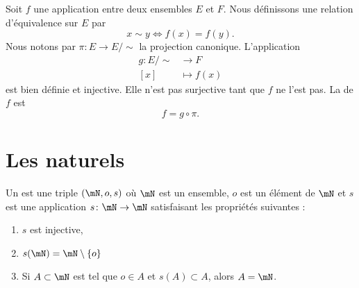 \begin{example}
Soit \( f\) une application entre deux ensembles \( E\) et \( F\). Nous définissons une relation d'équivalence sur \( E\) par
\begin{equation}
    x\sim y\Leftrightarrow f(x)=f(y).
\end{equation}
Nous notons par \( \pi\colon E\to E/\sim\) la projection canonique. L'application
\begin{equation}
    \begin{aligned}
        g\colon E/\sim&\to F \\
        [x]&\mapsto f(x)
    \end{aligned}
\end{equation}
est bien définie et injective. Elle n'est pas surjective tant que \( f\) ne l'est pas. La  de \( f\) est
\begin{equation}
    f=g\circ\pi.
\end{equation}
\end{example}

\section{Les naturels}
\label{SECooPJSYooNYaIaq}


\begin{definition}     \label{DEFooBJBOooWlblAx}
    Un  est une triple \( (\mN, o, s)\) où \( \mN\) est un ensemble, \( o\) est un élément de \( \mN\) et \( s\) est une application \( s\colon \mN\to \mN\) satisfaisant les propriétés suivantes :
    \begin{enumerate}
        \item
            \( s\) est injective,
        \item
            \( s(\mN)=\mN\setminus \{ o \} \)
        \item       \label{ITEMooXPYEooFajywh}
            Si \( A\subset \mN\) est tel que \( o\in A\) et \( s(A)\subset A\), alors \( A=\mN\).
    \end{enumerate}
\end{definition}


